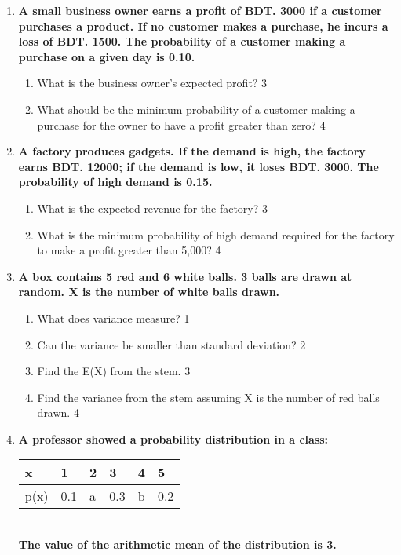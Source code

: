 \documentclass[a4paper,oneside, margin=1.4in]{book}
\begin{document}
\begin{enumerate}
  \item
\textbf{A small business owner earns a profit of BDT. 3000 if a customer purchases a product. If no customer makes a purchase, he incurs a loss of BDT. 1500. The probability of a customer making a purchase on a given day is 0.10.} 

\begin{enumerate}
    \item
    What is the business owner's expected profit? \hfill 3

    \item
    What should be the minimum probability of a customer making a purchase for the owner to have a profit greater than zero? \hfill 4
\end{enumerate}

\item
\textbf{A factory produces gadgets. If the demand is high, the factory earns BDT. 12000; if the demand is low, it loses BDT. 3000. The probability of high demand is 0.15.}

\begin{enumerate}
    \item
    What is the expected revenue for the factory? \hfill 3

    \item
    What is the minimum probability of high demand required for the factory to make a profit greater than 5,000? \hfill 4
\end{enumerate}

  
     \item
	  \textbf{A box contains 5 red and 6 white balls. 3 balls are drawn at random. X is the number of white balls drawn.} 
  
  \begin{enumerate}
    \item
	What does variance measure? \hfill 1
    \item
	Can the variance be smaller than standard deviation? \hfill 2
    \item  
	Find the E(X) from the stem. \hfill 3
    \item
	Find the variance from the stem assuming X is the number of red balls drawn. \hfill 4
  \end{enumerate}
  
   \item
	  \textbf{A professor showed a probability distribution in a class:}
	  
	  \begin{table}[h]
	  \begin{center}
\begin{tabular}{llllll}
x    & 1   & 2 & 3   & 4 & 5   \\ \hline
p(x) & 0.1 & a & 0.3 & b & 0.2 
\end{tabular} \\
\textbf{The value of the arithmetic mean of the distribution is 3.}
\end{center}	
\end{table}
    

\end{enumerate}
\end{document}
